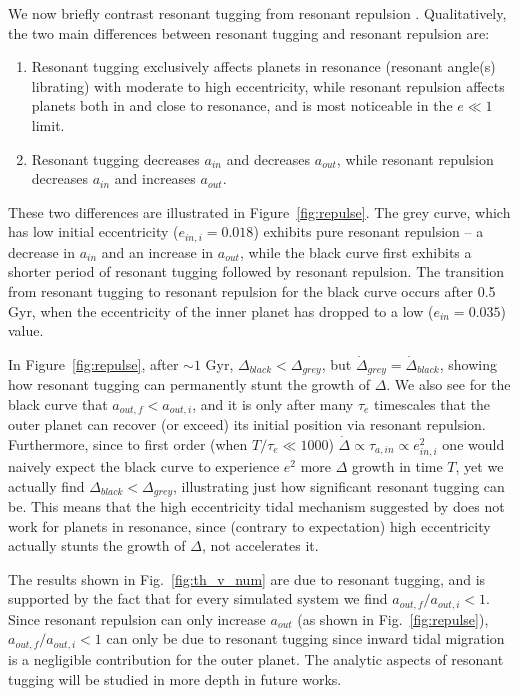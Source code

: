 We now briefly contrast resonant tugging from resonant repulsion \citep[first described by][]{LithwickWu2012}.
Qualitatively, the two main differences between resonant tugging and resonant repulsion are:
\begin{enumerate}
\item Resonant tugging exclusively affects planets in resonance (resonant angle(s) librating) with moderate to high eccentricity, while resonant repulsion affects planets both in and close to resonance, and is most noticeable in the $e \ll 1$ limit. 

\item Resonant tugging decreases $a_{in}$ and decreases $a_{out}$, while resonant repulsion decreases $a_{in}$ and increases $a_{out}$. 
\end{enumerate}

These two differences are illustrated in Figure~\ref{fig:repulse}.
The grey curve, which has low initial eccentricity ($e_{in,i} = 0.018$) exhibits pure resonant repulsion -- a decrease in $a_{in}$ and an increase in $a_{out}$, while the black curve first exhibits a shorter period of resonant tugging followed by resonant repulsion.
The transition from resonant tugging to resonant repulsion for the black curve occurs after 0.5 Gyr, when the eccentricity of the inner planet has dropped to a low ($e_{in} = 0.035$) value.

In Figure~\ref{fig:repulse}, after $\sim1$ Gyr, $\Delta_{black} < \Delta_{grey}$, but $\dot{\Delta}_{grey} = \dot{\Delta}_{black}$, showing how resonant tugging can permanently stunt the growth of $\Delta$.
We also see for the black curve that $a_{out,f} < a_{out,i}$, and it is only after many $\tau_e$ timescales that the outer planet can recover (or exceed) its initial position via resonant repulsion. 
Furthermore, since to first order (when $T/\tau_e \ll 1000$) $\dot{\Delta} \propto \tau_{a,in} \propto e_{in,i}^2$ one would naively expect the black curve to experience $e^2$ more $\Delta$ growth in time $T$, yet we actually find $\Delta_{black} < \Delta_{grey}$, illustrating just how significant resonant tugging can be.
This means that the high eccentricity tidal mechanism suggested by \citet{Delisle2014} does not work for planets in resonance, since (contrary to expectation) high eccentricity actually stunts the growth of $\Delta$, not accelerates it. 

The results shown in Fig.~\ref{fig:th_v_num} are due to resonant tugging, and is supported by the fact that for every simulated \kep{} system we find $a_{out,f} / a_{out,i} < 1$. 
Since resonant repulsion can only increase $a_{out}$ (as shown in Fig.~\ref{fig:repulse}), $a_{out,f} / a_{out,i} < 1$ can only be due to resonant tugging since inward tidal migration is a negligible contribution for the outer planet.
The analytic aspects of resonant tugging will be studied in more depth in future works.

